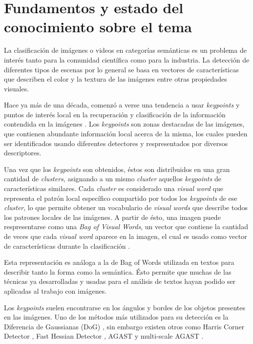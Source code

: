 \section{Fundamentos y estado del conocimiento sobre el tema} \label{fundyestarte}
\iffalse
Escriba una breve introducción general al tema y cite y comente las mayores
contribuciones en el tema específico, incluyendo bibliografıa actualizada.
\fi
La clasificación de imágenes o videos en categorías semánticas es un problema de interés tanto para la comunidad científica como
para la industria. La detección de diferentes tipos de escenas por lo general se basa en vectores de características que describen
el color y la textura de las imágenes entre otras propiedades visuales.

Hace ya más de una década, comenzó a verse una tendencia a usar \textit{keypoints} y puntos de interés local en la recuperación y
clasificación de la información contendida en la imágenes \parencite{csurka2004visual, lopes2010action}. Los \textit{keypoints} son zonas destacadas
de las imágenes, que contienen abundante información local acerca de la misma, los cuales pueden ser identificados usando diferentes detectores y respresentados
por diversos descriptores.

Una vez que los \textit{keypoints} son obtenidos, éstos son distribuidos en una gran cantidad de \textit{clusters}, asignando a un mismo
\textit{cluster} aquellos \textit{keypoints} de características similares. Cada \textit{cluster} es considerado una \textit{visual word}
que representa el patrón local específico compartido por todos los \textit{keypoints} de ese \textit{cluster}, lo que permite obtener un
vocabulario de \textit{visual words} que describe todos los patrones locales de las imágenes. A partir
de ésto, una imagen puede respresentarse como una \textit{Bag of Visual Words}, un vector que contiene
la cantidad de veces que cada \textit{visual word} aparece en la imagen, el cual es usado como vector
de características durante la clasificación \parencite{yang2007evaluating}.

Esta representación es análoga a la de Bag of Words utilizada en textos para describir tanto la forma
como la semántica. Ésto permite que muchas de las técnicas ya desarrolladas y usadas para el análisis de textos hayan podido ser aplicadas
al trabajo con imágenes.

Los \textit{keypoints} suelen encontrarse en los ángulos y bordes de los objetos presentes en las imágenes.
Uno de los métodos más utilizados para su detección es la Diferencia de Gaussianas (DoG) \parencite{lowe2004distinctive}, sin embargo existen otros como
Harris Corner Detector \parencite{harris1988combined}, Fast Hessian Detector \parencite{bay2006surf}, AGAST \parencite{mair2010adaptive} y
multi-scale AGAST \parencite{leutenegger2011brisk}. 

